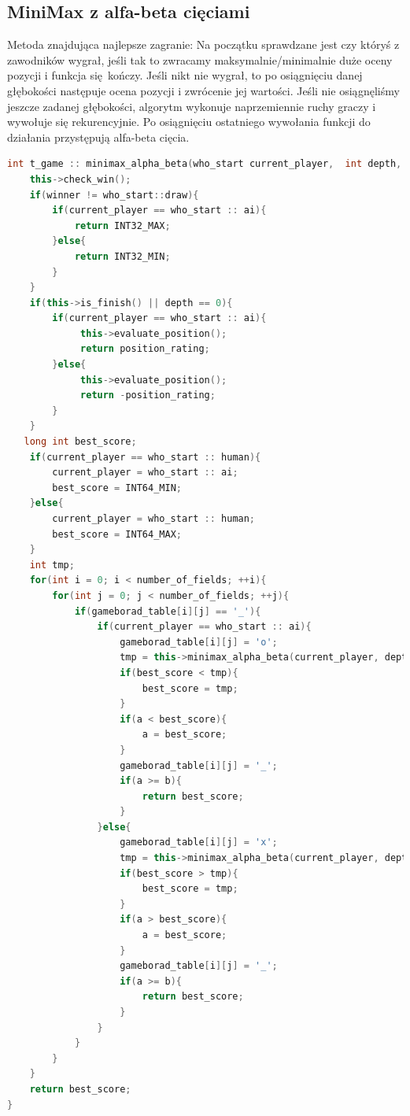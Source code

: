 \documentclass[12pt]{article}
\begin{document}
    

        \subsection{MiniMax z alfa-beta cięciami}
            Metoda znajdująca najlepsze zagranie: Na początku sprawdzane jest czy któryś z zawodników wygrał, jeśli tak to zwracamy maksymalnie/minimalnie duże oceny pozycji i funkcja się kończy.
            Jeśli nikt nie wygrał, to po osiągnięciu danej głębokości następuje ocena pozycji i zwrócenie jej wartości. Jeśli nie osiągnęliśmy jeszcze zadanej głębokości,
            algorytm wykonuje naprzemiennie ruchy graczy i wywołuje się rekurencyjnie. Po osiągnięciu ostatniego wywołania funkcji do działania przystępują alfa-beta cięcia.
            

            \begin{lstlisting}[language=C++, caption=minimax\_alpha\_beta()]
    int t_game :: minimax_alpha_beta(who_start current_player,  int depth, long int a, long int b){
    this->check_win();
    if(winner != who_start::draw){
        if(current_player == who_start :: ai){
            return INT32_MAX;
        }else{
            return INT32_MIN;
        }
    }
    if(this->is_finish() || depth == 0){
        if(current_player == who_start :: ai){
             this->evaluate_position();
             return position_rating;
        }else{
             this->evaluate_position();
             return -position_rating;
        }
    }
   long int best_score;
    if(current_player == who_start :: human){
        current_player = who_start :: ai;
        best_score = INT64_MIN;
    }else{
        current_player = who_start :: human;
        best_score = INT64_MAX;
    }
    int tmp;
    for(int i = 0; i < number_of_fields; ++i){
        for(int j = 0; j < number_of_fields; ++j){
            if(gameborad_table[i][j] == '_'){
                if(current_player == who_start :: ai){
                    gameborad_table[i][j] = 'o';
                    tmp = this->minimax_alpha_beta(current_player, depth-1, a, b);
                    if(best_score < tmp){
                        best_score = tmp;
                    }
                    if(a < best_score){
                        a = best_score;
                    }
                    gameborad_table[i][j] = '_';
                    if(a >= b){
                        return best_score;
                    }
                }else{
                    gameborad_table[i][j] = 'x';
                    tmp = this->minimax_alpha_beta(current_player, depth-1, a, b);
                    if(best_score > tmp){
                        best_score = tmp;
                    }
                    if(a > best_score){
                        a = best_score;
                    }
                    gameborad_table[i][j] = '_';
                    if(a >= b){
                        return best_score;
                    }
                }
            }
        } 
    }
    return best_score;
}
            \end{lstlisting}
\end{document}
